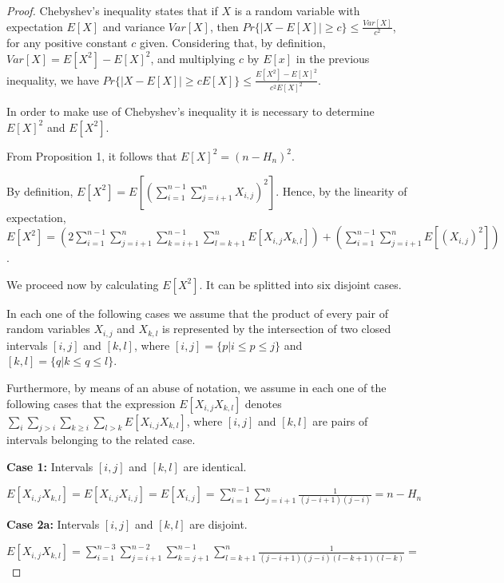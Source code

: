 \documentclass[12pt,letterpaper]{article}
\begin{document}
\begin{proof}

\noindent Chebyshev's inequality states that if $X$ is a random variable with expectation $E[X]$ and variance $Var[X]$,
then $Pr\{ |X - E[X]| \geq c \} \leq \frac{Var[X]}{c^2}$, for any positive constant $c$ given.
Considering that, by definition,  $Var[X] = E[X^2] - E[X]^2$, and multiplying $c$ by $E[x]$ in the previous inequality, we have
$Pr\{ |X - E[X]| \geq c E[X] \} \leq \frac{E[X^2] - E[X]^2}{c^2 E[X]^2}$.

In order to make use of Chebyshev's inequality it is necessary to determine $E[X]^2$ and  $E[X^2]$.

From Proposition 1, it follows that $E[X]^2 = (n - H_{n})^2$.

By definition, $E[X^2] = E [( \sum\limits_{i=1}^{n-1} \sum\limits_{j=i+1}^{n} X_{i,j})^2]$.
Hence, by the linearity of expectation, $E[X^2] = ( 2 \sum\limits_{i=1}^{n-1} \sum\limits_{j=i+1}^{n}
\sum\limits_{k=i+1}^{n-1} \sum\limits_{l=k+1}^{n} E[X_{i,j} X_{k,l}] ) +
( \sum\limits_{i=1}^{n-1} \sum\limits_{j=i+1}^{n} E[(X_{i,j})^2] )$.


We proceed now by calculating $E[X^2]$. It can be splitted into six disjoint cases.

In each one of the following cases we assume that the product of every pair  
of random variables $X_{i,j}$ and $X_{k,l}$  is represented by the intersection
of two closed intervals $[i,j]$ and $[k,l]$, where $[i,j] = \{p | i \leq p \leq j \}$
and $[k,l] = \{q | k \leq q \leq l \}$.

Furthermore, by means of an abuse of notation, we assume in each one of the following cases that
the expression $E[X_{i,j} X_{k,l}]$ denotes $\sum\limits_{i}\sum\limits_{j >i}\sum\limits_{k \geq i}\sum\limits_{l > k} E[X_{i,j} X_{k,l}]$, where $[i,j]$ and $[k,l]$ are pairs of intervals belonging to the related case.


{\bf Case 1:} Intervals  $[i, j]$ and $[k, l]$ are identical.

$E[X_{i,j} X_{k,l}] = E[X_{i,j} X_{i,j}] = E[X_{i,j}] = \sum\limits_{i=1}^{n-1} \sum\limits_{j=i+1}^{n}
\frac{1}{(j-i+1)(j-i)} = n - H_n$

\vspace{0.5cm}


{\bf Case 2a:} Intervals  $[i, j]$ and $[k, l]$ are disjoint.

$E[X_{i,j} X_{k,l}] = \sum\limits_{i=1}^{n-3} \sum\limits_{j=i+1}^{n-2}
\sum\limits_{k=j+1}^{n-1} \sum\limits_{l=k+1}^{n} \frac{1}{(j-i+1)(j-i)(l-k+1)(l-k)} = $


\end{proof}
\end{document}
